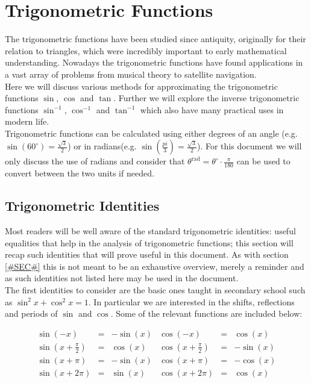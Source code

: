 \section{Trigonometric Functions}

The trigonometric functions have been studied since antiquity, originally for their relation to triangles, which were incredibly important to early mathematical understanding. Nowadays the trigonometric functions have found applications in a vast array of problems from musical theory to satellite navigation.\\

Here we will discuss various methods for approximating the trigonometric functions \(\sin\), \(\cos\) and \(\tan\). Further we will explore the inverse trigonometric functions \(\sin^{-1}\), \(\cos^{-1}\) and \(\tan^{-1}\) which also have many practical uses in modern life.\\

Trigonometric functions can be calculated using either degrees of an angle (e.g. \(\sin(60^{\circ}) = \frac{\sqrt{3}}{2}\)) or in radians(e.g. \(\sin(\frac{pi}{3}) = \frac{\sqrt{3}}{2}\)). For this document we will only discuss the use of radians and consider that \(\theta^\textrm{rad} = \theta^\circ \cdot \frac{\pi}{180}\) can be used to convert between the two units if needed.

\subsection{Trigonometric Identities}

Most readers will be well aware of the standard trigonometric identities: useful equalities that help in the analysis of trigonometric functions; this section will recap such identities that will prove useful in this document. As with section \ref{#SEC#} this is not meant to be an exhaustive overview, merely a reminder and as such identities not listed here may be used in the document.\\

The first identities to consider are the basic ones taught in secondary school such as \(\sin^2x + \cos^2x = 1\). In particular we are interested in the shifts, reflections and periods of \(\sin\) and \(\cos\). Some of the relevant functions are included below:

\begin{displaymath}
\begin{array}{rclrcl}
	\sin(-x) &=& -\sin(x) &\cos(-x) &=& \cos(x)\\
	\sin(x + \tfrac{\pi}{2}) &=& \cos(x) 
		&\cos(x + \tfrac{\pi}{2}) &=& -\sin(x)\\
	\sin(x + \pi) &=& -\sin(x) &\cos(x + \pi) &=& -\cos(x)\\
	\sin(x + 2\pi) &=& \sin(x) &\cos(x + 2\pi) &=& \cos(x)
\end{array}
\end{displaymath}

